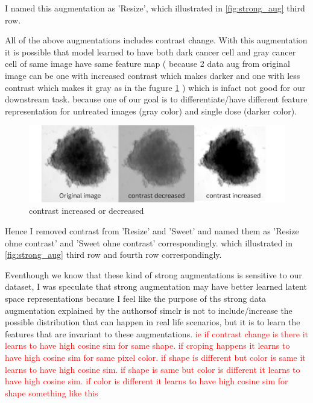 I named this augmentation as 'Resize', which illustrated in \ref{fig:strong_aug} third row.


All of the above augmentations includes contrast change. With this augmentation it is possible that model learned to have both dark cancer cell and gray cancer
cell of same image have same feature map ( because 2 data aug from original image can be one with increased contrast which makes darker and one with less contrast 
which makes it gray as in the fugure \ref{fig:ohne} ) which is infact not good for our downstream task. because one of our goal is to differentiate/have different feature representation
for  untreated images (gray color) and single dose (darker color). 

\begin{figure}[H]
  \centering
  \includegraphics[scale=0.4]{figures/ohne.png} 
  \caption{contrast increased or decreased}
  \label{fig:ohne}
\end{figure}

 
Hence I removed contrast from 'Resize' and 'Sweet' and named them as 'Resize ohne contrast' and 'Sweet ohne contrast' correspondingly. 
which illustrated in \ref{fig:strong_aug} third row and fourth row correspondingly. 

Eventhough we know that these kind of strong augmentations is sensitive to our dataset, I was speculate that strong augmentation may
 have better learned latent space representations because I feel like the purpose of ths strong data augmentation explained by the authorsof simclr is not to
 include/increase the possible distribution that can happen in real life scenarios, but it is to learn the features that are invariant to these augmentations.
 \textcolor{red}{ie if contrast change is there it learns to have high cosine sim for same shape. if croping happens it learns to have high cosine sim for same pixel 
 color. if shape is different but color is same it learns to have high cosine sim. if shape is same but color is different it learns to have high cosine sim. if  color
  is different it learns to have high cosine sim for shape something like this}

